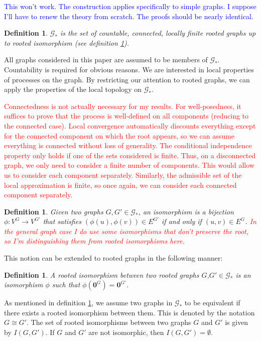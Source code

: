 \documentclass[12pt]{article}
\newcommand{\mc}{\mathcal}
\newcommand{\ra}{\rightarrow}
\newcommand{\tr}{\textcolor{red}}
\newcommand{\tb}{\textcolor{blue}}
\newcommand{\ind}{\hspace{24pt}}
\renewcommand{\root}{\mathbf{0}}					%
\newcommand{\gind}[1]{^{#1}}						%
\newcommand{\Gs}{\mc{G}_\ast}						%
\newcommand{\iso}{I}								%
\newtheorem{defn}[thms]{Definition}
\begin{document}
\tb{This won't work. The construction applies specifically to simple graphs. I suppose I'll have to renew the theory from scratch. The proofs should be nearly identical.}

\begin{defn}
\(\Gs\) is the set of countable, connected, locally finite rooted graphs up to rooted isomorphism (see definition \ref{lwc::riso}).
\label{lwc::gstar}
\end{defn}

All graphs considered in this paper are assumed to be members of \(\Gs\). Countability is required for obvious reasons. We are interested in local properties of processes on the graph. By restricting our attention to rooted graphs, we can apply the properties of the local topology on \(\Gs\). 

\ind \tr{Connectedness is not actually necessary for my results. For well-posedness, it suffices to prove that the process is well-defined on all components (reducing to the connected case). Local convergence automatically discounts everything except for the connected component on which the root appears, so we can assume everything is connected without loss of generality. The conditional independence property only holds if one of the sets considered is finite. Thus, on a disconnected graph, we only need to consider a finite number of components. This would allow us to consider each component separately. Similarly, the admissible set of the local approximation is finite, so once again, we can consider each connected component separately.}

\begin{defn}
Given two graphs \(G,G' \in \Gs\), an isomorphism is a bijection \(\phi: V\gind{G} \ra V\gind{G'}\) that satisfies \((\phi(u),\phi(v)) \in E\gind{G'}\) if and only if \((u,v) \in E\gind{G}\). \tr{In the general graph case I do use some isomorphisms that don't preserve the root, so I'm distinguishing them from rooted isomorphisms here.}
\label{lwc::iso}
\end{defn}

This notion can be extended to rooted graphs in the following manner:

\begin{defn}
A rooted isomorphism between two rooted graphs \(G\),\(G' \in \Gs\) is an isomorphism \(\phi\) such that \(\phi(\root\gind{G}) = \root\gind{G'}\).
\label{lwc::riso}
\end{defn}

As mentioned in definition \ref{lwc::gstar}, we assume two graphs in \(\Gs\) to be equivalent if there exists a rooted isomorphism between them. This is denoted by the notation \(G \cong G'\). The set of rooted isomorphisms between two graphs \(G\) and \(G'\) is given by \(\iso(G,G')\). If \(G\) and \(G'\) are not isomorphic, then \(\iso(G,G') = \emptyset\).
\end{document}
